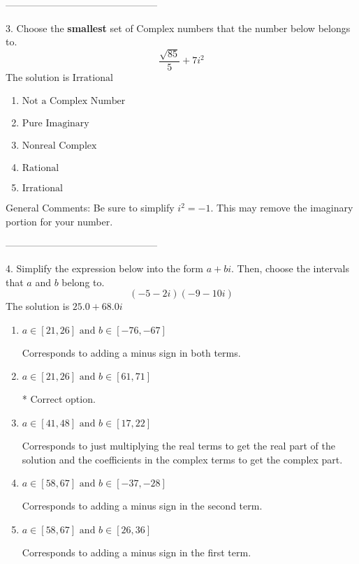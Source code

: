 \documentclass{article}[10pt]
\begin{document}
-----------------------------------------------

3. Choose the \textbf{smallest} set of Complex numbers that the number below belongs to.
$$ \frac{\sqrt{85}}{5}+7 i^2 $$ 
The solution is $ \text{Irrational} $ 

\begin{enumerate}[label=\Alph*.] 
\item $ \text{Not a Complex Number} $ 

  
\item $ \text{Pure Imaginary} $ 

  
\item $ \text{Nonreal Complex} $ 

  
\item $ \text{Rational} $ 

  
\item $ \text{Irrational} $ 

  
\end{enumerate} 
 
General Comments: Be sure to simplify $i^2 = -1$. This may remove the imaginary portion for your number.

-----------------------------------------------

4. Simplify the expression below into the form $a+bi$. Then, choose the intervals that $a$ and $b$ belong to.
$$ (-5 - 2 i)(-9 - 10 i) $$ 
The solution is $ 25.0 + 68.0 i $ 

\begin{enumerate}[label=\Alph*.] 
\item $ a \in [21, 26] \text{ and } b \in [-76, -67] $ 

  Corresponds to adding a minus sign in both terms. 
\item $ a \in [21, 26] \text{ and } b \in [61, 71] $ 

 * Correct option. 
\item $ a \in [41, 48] \text{ and } b \in [17, 22] $ 

  Corresponds to just multiplying the real terms to get the real part of the solution and the coefficients in the complex terms to get the complex part. 
\item $ a \in [58, 67] \text{ and } b \in [-37, -28] $ 

  Corresponds to adding a minus sign in the second term. 
\item $ a \in [58, 67] \text{ and } b \in [26, 36] $ 

  Corresponds to adding a minus sign in the first term. 
\end{enumerate} 
 
\end{document}
